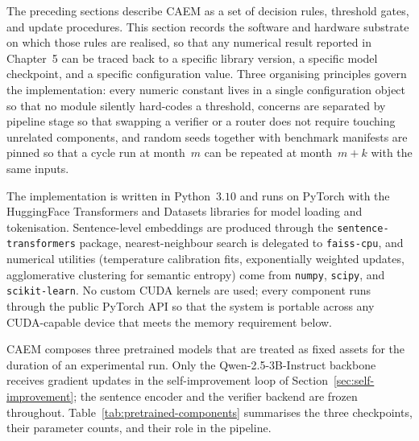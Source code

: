 The preceding sections describe CAEM as a set of decision rules, threshold gates, and update procedures. This section records the software and hardware substrate on which those rules are realised, so that any numerical result reported in Chapter~5 can be traced back to a specific library version, a specific model checkpoint, and a specific configuration value. Three organising principles govern the implementation: every numeric constant lives in a single configuration object so that no module silently hard-codes a threshold, concerns are separated by pipeline stage so that swapping a verifier or a router does not require touching unrelated components, and random seeds together with benchmark manifests are pinned so that a cycle run at month~$m$ can be repeated at month~$m + k$ with the same inputs.

The implementation is written in Python~$3.10$ and runs on PyTorch with the HuggingFace Transformers and Datasets libraries for model loading and tokenisation. Sentence-level embeddings are produced through the \texttt{sentence-transformers} package, nearest-neighbour search is delegated to \texttt{faiss-cpu}, and numerical utilities (temperature calibration fits, exponentially weighted updates, agglomerative clustering for semantic entropy) come from \texttt{numpy}, \texttt{scipy}, and \texttt{scikit-learn}. No custom CUDA kernels are used; every component runs through the public PyTorch API so that the system is portable across any CUDA-capable device that meets the memory requirement below.

CAEM composes three pretrained models that are treated as fixed assets for the duration of an experimental run. Only the Qwen-2.5-3B-Instruct backbone receives gradient updates in the self-improvement loop of Section~\ref{sec:self-improvement}; the sentence encoder and the verifier backend are frozen throughout. Table~\ref{tab:pretrained-components} summarises the three checkpoints, their parameter counts, and their role in the pipeline.

